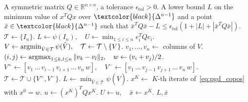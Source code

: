 \documentclass[12pt]{article}
\newcommand{\reals}{\mathbb{R}}
\newcommand{\argmin}{\mathop{\rm argmin}}
\newcommand{\mcS}{\mathcal{S}}
\newcommand{\mcT}{\mathcal{T}}
\theoremstyle{remark}
\begin{document}
\begin{algorithm}[H]
\caption{Spatial Branch-and-Bound Algorithm for Testing Matrix Copositivity}
\label{alg:bnb_simplex}
\begin{algorithmic}
\Require A symmetric matrix $Q\in\reals^{n\times n}$, a tolerance $\epsilon_{\text{tol}}>0$.
\Ensure A lower bound $L$ on the minimum value of $x^TQx$ over $\textcolor{black}{\Delta^{n-1}}$ and a point $\bar{x}\in\textcolor{black}{\Delta^{n-1}}$ such that
$\bar{x}^TQ\bar{x}-L\le \epsilon_{\text{tol}}(1+|L|+|\bar{x}^TQ\bar{x}|)$.
\Initialization
$\mcT\gets\{I_n\}$. 
\State $L\gets \psi(I_n),\quad U\gets \min_{1\le i\le n} e_i^TQe_i$. 
\State $V\gets \argmin_{\hat{V}\in\mcT} \psi(\hat{V}),\quad \mcT\gets \mcT\setminus\{V\}$. 
\State $v_1, \ldots, v_n \gets$ columns of $V$.
\State $(i, j) \gets \operatornamewithlimits{argmax}_{1 \le k, l \le n} \|v_k-v_l\|_2,\quad w \gets (v_i + v_j)/2$.
\State $V^+ \gets [v_1\, \ldots\, v_{i-1}\, v_{i+1}\, \ldots\, v_n\, w],\quad V^- \gets [v_1\, \ldots\, v_{j-1}\, v_{j+1}\, \ldots\, v_n\, w]$. 
\State $\mcT \gets \mcT \cup \{V^+,V^-\}$.
\State $L\gets \min_{\hat{V}\in \mcT} \psi(\hat{V})$.  
\State $x^K \gets$ $K$-th iterate of~\eqref{eq:pgd_copos} with $x^0=w$.
\State $u\gets (x^K)^TQx^K$.
 $U\gets u,\quad \bar{x}\gets x^K$.\EndIf
\EndFor
\EndWhile
\State \Return $L, \bar{x}$
\end{algorithmic}
\end{algorithm}
\end{document}
